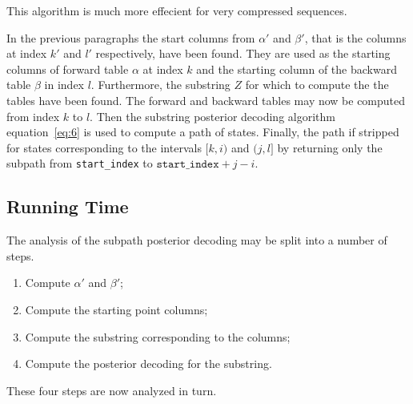 This algorithm is much more effecient for very compressed sequences.

In the previous paragraphs the start columns from $\alpha'$ and $\beta'$, that
is the columns at index $k'$ and $l'$ respectively, have been found. They are
used as the starting columns of forward table $\alpha$ at index $k$ and the
starting column of the backward table $\beta$ in index $l$. Furthermore, the
substring $Z$ for which to compute the the tables have been found. The forward
and backward tables may now be computed from index $k$ to $l$. Then the
substring posterior decoding algorithm equation~\eqref{eq:6} is used to compute
a path of states. Finally, the path if stripped for states corresponding to the
intervals $[k, i)$ and $(j, l]$ by returning only the subpath from \texttt{start\_index}
to $\texttt{start\_index} + j - i$.

\subsection{Running Time}
\label{sec:running-time-2}

The analysis of the subpath posterior decoding may be split into a number of
steps.
\begin{enumerate}
\item Compute $\alpha'$ and $\beta'$;
\item Compute the starting point columns;
\item Compute the substring corresponding to the columns;
\item Compute the posterior decoding for the substring.
\end{enumerate}
These four steps are now analyzed in turn.

